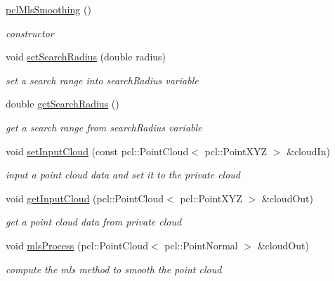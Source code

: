 \begin{DoxyCompactItemize}
\item 
\hyperlink{classpclMlsSmoothing_a432b28f2d31dd09a68233e34e51f733e}{pcl\+Mls\+Smoothing} ()\hypertarget{classpclMlsSmoothing_a432b28f2d31dd09a68233e34e51f733e}{}\label{classpclMlsSmoothing_a432b28f2d31dd09a68233e34e51f733e}

\begin{DoxyCompactList}\small\item\em constructor \end{DoxyCompactList}\item 
void \hyperlink{classpclMlsSmoothing_a992cb767ccb2e64b6d09e24cd5a9f80c}{set\+Search\+Radius} (double radius)
\begin{DoxyCompactList}\small\item\em set a search range into search\+Radius variable \end{DoxyCompactList}\item 
double \hyperlink{classpclMlsSmoothing_a1675949acb6f8333557e9b7d16664fec}{get\+Search\+Radius} ()
\begin{DoxyCompactList}\small\item\em get a search range from search\+Radius variable \end{DoxyCompactList}\item 
void \hyperlink{classpclMlsSmoothing_a405d1ba5aaca55d2e560e1dc02b3e725}{set\+Input\+Cloud} (const pcl\+::\+Point\+Cloud$<$ pcl\+::\+Point\+X\+YZ $>$ \&cloud\+In)
\begin{DoxyCompactList}\small\item\em input a point cloud data and set it to the private cloud \end{DoxyCompactList}\item 
void \hyperlink{classpclMlsSmoothing_a2ebbe84a7c774532fa9a3f7073991594}{get\+Input\+Cloud} (pcl\+::\+Point\+Cloud$<$ pcl\+::\+Point\+X\+YZ $>$ \&cloud\+Out)
\begin{DoxyCompactList}\small\item\em get a point cloud data from private cloud \end{DoxyCompactList}\item 
void \hyperlink{classpclMlsSmoothing_a214375dff0302996fdb76000b02a0aa9}{mls\+Process} (pcl\+::\+Point\+Cloud$<$ pcl\+::\+Point\+Normal $>$ \&cloud\+Out)
\begin{DoxyCompactList}\small\item\em compute the mls method to smooth the point cloud \end{DoxyCompactList}\end{DoxyCompactItemize}


